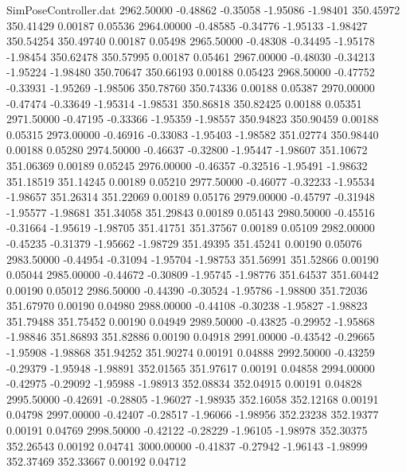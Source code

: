 \begin{filecontents}{SimPoseController.dat}
2962.50000   -0.48862   -0.35058    -1.95086   -1.98401  350.45972  350.41429    0.00187    0.05536
2964.00000   -0.48585   -0.34776    -1.95133   -1.98427  350.54254  350.49740    0.00187    0.05498
2965.50000   -0.48308   -0.34495    -1.95178   -1.98454  350.62478  350.57995    0.00187    0.05461
2967.00000   -0.48030   -0.34213    -1.95224   -1.98480  350.70647  350.66193    0.00188    0.05423
2968.50000   -0.47752   -0.33931    -1.95269   -1.98506  350.78760  350.74336    0.00188    0.05387
2970.00000   -0.47474   -0.33649    -1.95314   -1.98531  350.86818  350.82425    0.00188    0.05351
2971.50000   -0.47195   -0.33366    -1.95359   -1.98557  350.94823  350.90459    0.00188    0.05315
2973.00000   -0.46916   -0.33083    -1.95403   -1.98582  351.02774  350.98440    0.00188    0.05280
2974.50000   -0.46637   -0.32800    -1.95447   -1.98607  351.10672  351.06369    0.00189    0.05245
2976.00000   -0.46357   -0.32516    -1.95491   -1.98632  351.18519  351.14245    0.00189    0.05210
2977.50000   -0.46077   -0.32233    -1.95534   -1.98657  351.26314  351.22069    0.00189    0.05176
2979.00000   -0.45797   -0.31948    -1.95577   -1.98681  351.34058  351.29843    0.00189    0.05143
2980.50000   -0.45516   -0.31664    -1.95619   -1.98705  351.41751  351.37567    0.00189    0.05109
2982.00000   -0.45235   -0.31379    -1.95662   -1.98729  351.49395  351.45241    0.00190    0.05076
2983.50000   -0.44954   -0.31094    -1.95704   -1.98753  351.56991  351.52866    0.00190    0.05044
2985.00000   -0.44672   -0.30809    -1.95745   -1.98776  351.64537  351.60442    0.00190    0.05012
2986.50000   -0.44390   -0.30524    -1.95786   -1.98800  351.72036  351.67970    0.00190    0.04980
2988.00000   -0.44108   -0.30238    -1.95827   -1.98823  351.79488  351.75452    0.00190    0.04949
2989.50000   -0.43825   -0.29952    -1.95868   -1.98846  351.86893  351.82886    0.00190    0.04918
2991.00000   -0.43542   -0.29665    -1.95908   -1.98868  351.94252  351.90274    0.00191    0.04888
2992.50000   -0.43259   -0.29379    -1.95948   -1.98891  352.01565  351.97617    0.00191    0.04858
2994.00000   -0.42975   -0.29092    -1.95988   -1.98913  352.08834  352.04915    0.00191    0.04828
2995.50000   -0.42691   -0.28805    -1.96027   -1.98935  352.16058  352.12168    0.00191    0.04798
2997.00000   -0.42407   -0.28517    -1.96066   -1.98956  352.23238  352.19377    0.00191    0.04769
2998.50000   -0.42122   -0.28229    -1.96105   -1.98978  352.30375  352.26543    0.00192    0.04741
3000.00000   -0.41837   -0.27942    -1.96143   -1.98999  352.37469  352.33667    0.00192    0.04712

\end{filecontents}
